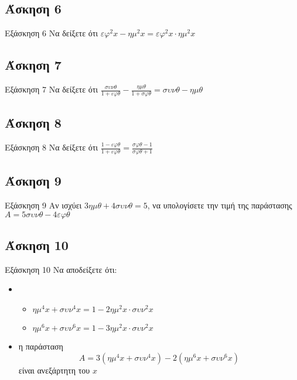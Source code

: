 \documentclass[greek]{beamer}
\begin{document}
\subsection{Άσκηση 6}
\begin{frame}[label=Άσκηση6]{Εξάσκηση 6}
 Να δείξετε ότι $εφ^2x-ημ^2x=εφ^2x\cdot ημ^2x$

\end{frame}

\subsection{Άσκηση 7}
\begin{frame}[label=Άσκηση]{Εξάσκηση 7}
 Να δείξετε ότι $\frac{συνθ}{1+εφθ}-\frac{ημθ}{1+σφθ}=συνθ-ημθ$

\end{frame}

\subsection{Άσκηση 8}
\begin{frame}[label=Άσκηση8]{Εξάσκηση 8}
 Να δείξετε ότι $\frac{1-εφθ}{1+εφθ}=\frac{σφθ-1}{σφθ+1}$

\end{frame}

\subsection{Άσκηση 9}
\begin{frame}[label=Άσκηση9]{Εξάσκηση 9}
 Αν ισχύει $3ημθ+4συνθ=5$, να υπολογίσετε την τιμή της παράστασης $Α=5συνθ-4εφθ$

\end{frame}

\subsection{Άσκηση 10}
\begin{frame}[label=Άσκηση10]{Εξάσκηση 10}
 Να αποδείξετε ότι:
 \begin{itemize}
   \item \begin{itemize}
     \item $ημ^4x+συν^4x=1-2ημ^2x\cdot συν^2x$
       \item $ημ^6x+συν^6x=1-3ημ^2x\cdot συν^2x$
   \end{itemize}
   \item η παράσταση
   $$Α=3(ημ^4x+συν^4x)-2(ημ^6x+συν^6x)$$
   είναι ανεξάρτητη του $x$
 \end{itemize}

\end{frame}
\end{document}
